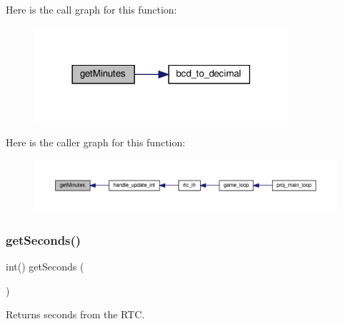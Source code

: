 Here is the call graph for this function\+:
\nopagebreak
\begin{figure}[H]
\begin{center}
\leavevmode
\includegraphics[width=266pt]{group__rtc_gad64e3c6015d2b7c99c50817798309d52_cgraph}
\end{center}
\end{figure}
Here is the caller graph for this function\+:
\nopagebreak
\begin{figure}[H]
\begin{center}
\leavevmode
\includegraphics[width=350pt]{group__rtc_gad64e3c6015d2b7c99c50817798309d52_icgraph}
\end{center}
\end{figure}
\mbox{\label{group__rtc_ga03144495c6cd7841203162b527998b53}} 
\subsubsection{\texorpdfstring{get\+Seconds()}{getSeconds()}}
{\footnotesize\ttfamily int() get\+Seconds (\begin{DoxyParamCaption}{ }\end{DoxyParamCaption})}



Returns seconds from the R\+TC. 

